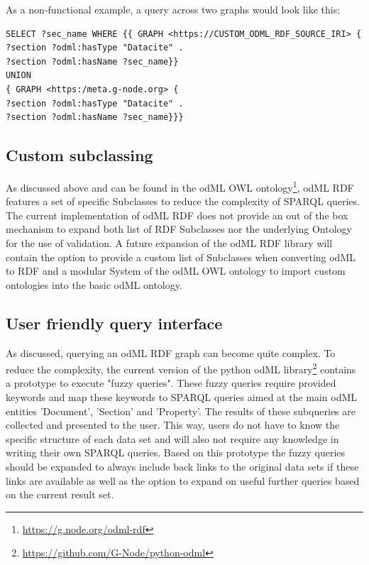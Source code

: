 \documentclass{article}
\begin{document}
As a non-functional example, a query across two graphs would look like this:

\begin{lstlisting}
SELECT ?sec_name WHERE {{ GRAPH <https://CUSTOM_ODML_RDF_SOURCE_IRI> {
?section ?odml:hasType "Datacite" .
?section ?odml:hasName ?sec_name}}
UNION
{ GRAPH <https:/meta.g-node.org> {
?section ?odml:hasType "Datacite" .
?section ?odml:hasName ?sec_name}}}
\end{lstlisting}

\subsection{Custom subclassing}\label{sec:outlook_subclassing}
As discussed above and can be found in the odML OWL ontology\footnote{\url{https://g.node.org/odml-rdf}}, odML RDF features a set of specific Subclasses to reduce the complexity of SPARQL queries. The current implementation of odML RDF does not provide an out of the box mechanism to expand both list of RDF Subclasses nor the underlying Ontology for the use of validation. A future expansion of the odML RDF library will contain the option to provide a custom list of Subclasses when converting odML to RDF and a modular System of the odML OWL ontology to import custom ontologies into the basic odML ontology.

\subsection{User friendly query interface}\label{sec:outlook_fuzzy_queries}
As discussed, querying an odML RDF graph can become quite complex. To reduce the complexity, the current version of the python odML library\footnote{\url{https://github.com/G-Node/python-odml}} contains a prototype to execute "fuzzy queries". These fuzzy queries require provided keywords and map these keywords to SPARQL queries aimed at the main odML entities 'Document', 'Section' and 'Property'. The results of these subqueries are collected and presented to the user. This way, users do not have to know the specific structure of each data set and will also not require any knowledge in writing their own SPARQL queries. Based on this prototype the fuzzy queries should be expanded to always include back links to the original data sets if these links are available as well as the option to expand on useful further queries based on the current result set.
\end{document}

